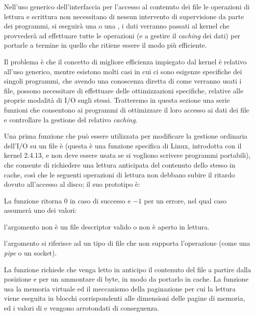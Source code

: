 Nell'uso generico dell'interfaccia per l'accesso al contenuto dei file le
operazioni di lettura e scrittura non necessitano di nessun intervento di
supervisione da parte dei programmi, si eseguirà una  o una
, i dati verranno passati al kernel che provvederà ad effettuare
tutte le operazioni (e a gestire il \textit{caching} dei dati) per portarle a
termine in quello che ritiene essere il modo più efficiente.

Il problema è che il concetto di migliore efficienza impiegato dal kernel è
relativo all'uso generico, mentre esistono molti casi in cui ci sono esigenze
specifiche dei singoli programmi, che avendo una conoscenza diretta di come
verranno usati i file, possono necessitare di effettuare delle ottimizzazioni
specifiche, relative alle proprie modalità di I/O sugli stessi. Tratteremo in
questa sezione una serie funzioni che consentono ai programmi di ottimizzare
il loro accesso ai dati dei file e controllare la gestione del relativo
\textit{caching}.


Una prima funzione che può essere utilizzata per modificare la gestione
ordinaria dell'I/O su un file è  (questa è una funzione
specifica di Linux, introdotta con il kernel 2.4.13, e non deve essere usata
se si vogliono scrivere programmi portabili), che consente di richiedere una
lettura anticipata del contenuto dello stesso in cache, così che le seguenti
operazioni di lettura non debbano subire il ritardo dovuto all'accesso al
disco; il suo prototipo è:

\begin{funcproto}{
}

{La funzione ritorna $0$ in caso di successo e $-1$ per un errore, nel qual
  caso  assumerà uno dei valori: 
  \begin{errlist}
    \item[\errcode{EBADF}] l'argomento  non è un file descriptor
      valido o non è aperto in lettura.
    \item[\errcode{EINVAL}] l'argomento  si riferisce ad un tipo di
      file che non supporta l'operazione (come una \textit{pipe} o un socket).
  \end{errlist}
}
\end{funcproto}

La funzione richiede che venga letto in anticipo il contenuto del file
 a partire dalla posizione  e per un ammontare di
 byte, in modo da portarlo in cache.  La funzione usa la memoria
virtuale ed il meccanismo della paginazione per cui la lettura viene eseguita
in blocchi corrispondenti alle dimensioni delle pagine di memoria, ed i valori
di  e  vengono arrotondati di conseguenza.

